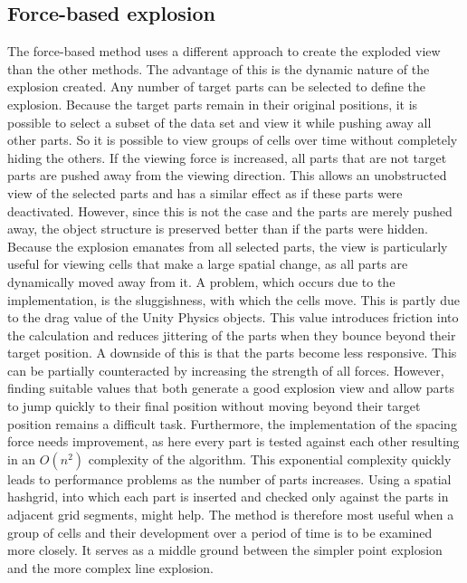 \subsection{Force-based explosion}
The force-based method uses a different approach to create the exploded view than the other methods. The advantage of this is the dynamic nature of the explosion created. Any number of target parts can be selected to define the explosion. Because the target parts remain in their original positions, it is possible to select a subset of the data set and view it while pushing away all other parts. So it is possible to view groups of cells over time without completely hiding the others. If the viewing force is increased, all parts that are not target parts are pushed away from the viewing direction. This allows an unobstructed view of the selected parts and has a similar effect as if these parts were deactivated. However, since this is not the case and the parts are merely pushed away, the object structure is preserved better than if the parts were hidden. Because the explosion emanates from all selected parts, the view is particularly useful for viewing cells that make a large spatial change, as all parts are dynamically moved away from it. A problem, which occurs due to the implementation, is the sluggishness, with which the cells move. This is partly due to the drag value of the Unity Physics objects. This value introduces friction into the calculation and reduces jittering of the parts when they bounce beyond their target position. A downside of this is that the parts become less responsive. This can be partially counteracted by increasing the strength of all forces. However, finding suitable values that both generate a good explosion view and allow parts to jump quickly to their final position without moving beyond their target position remains a difficult task. Furthermore, the implementation of the spacing force needs improvement, as here every part is tested against each other resulting in an $O(n^2)$ complexity of the algorithm. This exponential complexity quickly leads to performance problems as the number of parts increases. Using a spatial hashgrid, into which each part is inserted and checked only against the parts in adjacent grid segments, might help. The method is therefore most useful when a group of cells and their development over a period of time is to be examined more closely. It serves as a middle ground between the simpler point explosion and the more complex line explosion.

